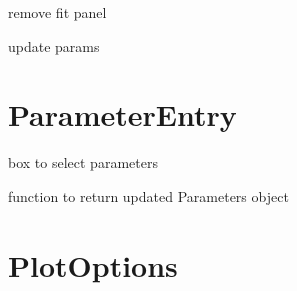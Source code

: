 \documentclass[letterpaper,10pt,english]{sphinxmanual}
\begin{document}
\begin{fulllineitems}
\begin{fulllineitems}
\label{Options:Optionswidgets.Options.remove_fit_panel}
remove fit panel

\end{fulllineitems}


\begin{fulllineitems}
\label{Options:Optionswidgets.Options.save_params}
update params

\end{fulllineitems}


\begin{fulllineitems}
\label{Options:Optionswidgets.Options.set_current_fit}
\end{fulllineitems}


\end{fulllineitems}



\section{ParameterEntry}
\label{ParameterEntry:parameterentry}\label{ParameterEntry::doc}

\begin{fulllineitems}
\label{ParameterEntry:Optionswidgets.ParameterEntry}
box to select parameters

\begin{fulllineitems}
\label{ParameterEntry:Optionswidgets.ParameterEntry.readout}
function to return updated Parameters object

\end{fulllineitems}


\end{fulllineitems}



\section{PlotOptions}
\label{PlotOptions::doc}\label{PlotOptions:plotoptions}
\end{document}
